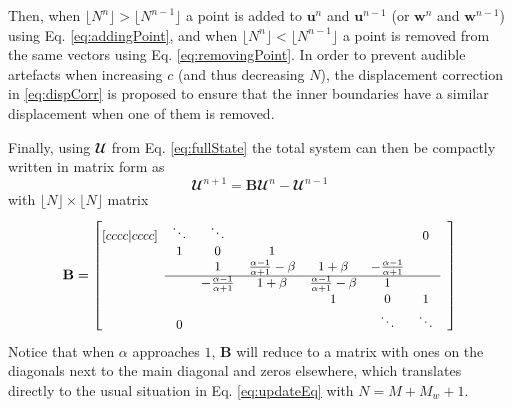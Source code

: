 Then, when $\lfloor N^n \rfloor > \lfloor N^{n-1} \rfloor$ a point is added to $\mathbf{u}^n$ and $\mathbf{u}^{n-1}$ (or $\mathbf{w}^n$ and $\mathbf{w}^{n-1}$) using Eq. \eqref{eq:addingPoint}, and when $\lfloor N^n \rfloor <\lfloor N^{n-1} \rfloor$ a point is removed from the same vectors using Eq. \eqref{eq:removingPoint}. In order to prevent audible artefacts when increasing $c$ (and thus decreasing $N$), the displacement correction in \eqref{eq:dispCorr} is proposed to ensure that the inner boundaries have a similar displacement when one of them is removed.

Finally, using $\mathbfcal{U}$ from Eq. \eqref{eq:fullState} the total system can then be compactly written in matrix form as
\begin{equation}\label{eq:totalSystem}
    \mathbfcal{U}^{n+1} = 
    \mathbf{B} 
    \mathbfcal{U}^n
    - \mathbfcal{U}^{n-1}
\end{equation}
with $\lfloor N\rfloor \times \lfloor N\rfloor$ matrix
\begin{equation}\label{eq:bMat}\small
    \mathbf{B} = \begin{bmatrix}[cccc|cccc]
        & \ddots  &\ddots & & & & 0 & \\
          & 1 & 0 & 1 & & & & \\
         & & 1 & \frac{\alpha - 1}{\alpha + 1} - \beta  & 1 + \beta & -\frac{\alpha - 1}{\alpha + 1} & \\ \cline{2-7}
         & & -\frac{\alpha - 1}{\alpha + 1} & 1 + \beta & \frac{\alpha - 1}{\alpha + 1} - \beta  & 1 & & \\
            & & & &1 & 0 & 1  \\
            & 0 & &  &  &\ddots & \ddots &
       \end{bmatrix}
\end{equation}
%
%
Notice that when $\alpha$ approaches $1$, $\mathbf{B}$ will reduce to a matrix with ones on the diagonals next to the main diagonal and zeros elsewhere, which translates directly to the usual situation in Eq. \eqref{eq:updateEq} with $N = M + M_w + 1$. 

